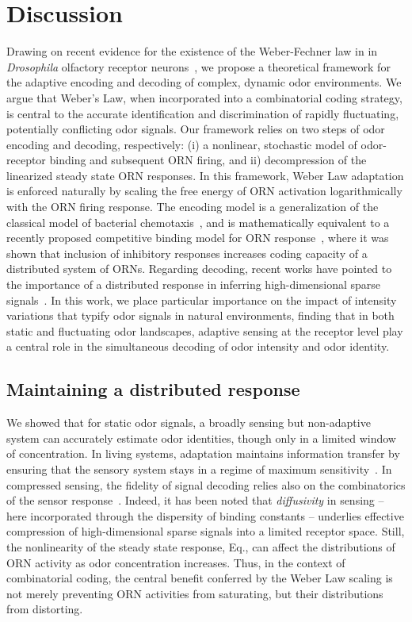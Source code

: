 \section{Discussion}

Drawing on recent evidence for the existence of the Weber-Fechner law in in \textit{Drosophila} olfactory receptor neurons~\cite{cafaro_WL, cao_WL,  srinivas_elife}, we propose a theoretical framework for the adaptive encoding and decoding of complex, dynamic odor environments. We argue that Weber's Law, when incorporated into a combinatorial coding strategy, is central to the accurate identification and discrimination of rapidly fluctuating, potentially conflicting odor signals. Our framework relies on two steps of odor encoding and decoding, respectively: (i) a nonlinear, stochastic model of odor-receptor binding and subsequent ORN firing, and ii) decompression of the linearized steady state ORN responses. In this framework, Weber Law adaptation is enforced naturally by scaling the free energy of ORN activation logarithmically with the ORN firing response. The encoding model is a generalization of the classical model of bacterial chemotaxis~\cite{tu_shimizu_berg}, and is mathematically equivalent to a recently proposed competitive binding model for ORN response~\cite{Cao_Tu_WL}, where it was shown that inclusion of inhibitory responses increases coding capacity of a distributed system of ORNs. Regarding decoding, recent works have pointed to the importance of a distributed response in inferring high-dimensional sparse signals~\cite{vijay_1, vijay_2, sharpee_zhang}. In this work, we place particular importance on the impact of intensity variations that typify odor signals in natural environments, finding that in both static and fluctuating odor landscapes, adaptive sensing at the receptor level play a central role in the simultaneous decoding of odor intensity and odor identity. 


\subsection{Maintaining a distributed response}

We showed that for static odor signals, a broadly sensing but non-adaptive system can accurately estimate odor identities, though only in a limited window of concentration. In living systems, adaptation maintains information transfer by ensuring that the sensory system stays in a regime of maximum sensitivity~\cite{information_theory_adaptation}. In compressed sensing, the fidelity of signal decoding relies also on the combinatorics of the sensor response~\cite{CS_tao, CS_donoho, CS_ganguli}. Indeed, it has been noted that \textit{diffusivity} in sensing -- here incorporated through the dispersity of binding constants -- underlies effective compression of high-dimensional sparse signals into a limited receptor space. Still, the nonlinearity of the steady state response, Eq., can affect the distributions of ORN activity as odor concentration increases. Thus, in the context of combinatorial coding, the central benefit conferred by the Weber Law scaling is not merely preventing ORN activities from saturating, but their distributions from distorting. 

